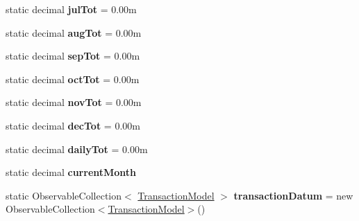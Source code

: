 \begin{DoxyCompactItemize}
static decimal {\bfseries jul\+Tot} = 0.\+00m
\item 
\mbox{\label{class_pocket_saver_1_1_view_models_1_1_home_page_1_1_home_page_view_model_ad6d58a2aa9455006970a5f7965838560}} 
static decimal {\bfseries aug\+Tot} = 0.\+00m
\item 
\mbox{\label{class_pocket_saver_1_1_view_models_1_1_home_page_1_1_home_page_view_model_a078932979150486d47e7b58315b7d73b}} 
static decimal {\bfseries sep\+Tot} = 0.\+00m
\item 
\mbox{\label{class_pocket_saver_1_1_view_models_1_1_home_page_1_1_home_page_view_model_ac6c25c485a627b506677a58374420aa3}} 
static decimal {\bfseries oct\+Tot} = 0.\+00m
\item 
\mbox{\label{class_pocket_saver_1_1_view_models_1_1_home_page_1_1_home_page_view_model_a0d65f819fd68b7aed5f345dbcf6cc1a4}} 
static decimal {\bfseries nov\+Tot} = 0.\+00m
\item 
\mbox{\label{class_pocket_saver_1_1_view_models_1_1_home_page_1_1_home_page_view_model_a9056e97b107389f478d9c65df09854d1}} 
static decimal {\bfseries dec\+Tot} = 0.\+00m
\item 
\mbox{\label{class_pocket_saver_1_1_view_models_1_1_home_page_1_1_home_page_view_model_af25cd2db69255a24c26b8612e423a7fb}} 
static decimal {\bfseries daily\+Tot} = 0.\+00m
\item 
\mbox{\label{class_pocket_saver_1_1_view_models_1_1_home_page_1_1_home_page_view_model_a4957ea515a85f86cf70211a870140e2d}} 
static decimal {\bfseries current\+Month}
\item 
\mbox{\label{class_pocket_saver_1_1_view_models_1_1_home_page_1_1_home_page_view_model_a3034fbc8b70023bf0d26cd6eef85f9c0}} 
static Observable\+Collection$<$ \hyperlink{class_pocket_saver_1_1_models_1_1_transaction_model}{Transaction\+Model} $>$ {\bfseries transaction\+Datum} = new Observable\+Collection$<$\hyperlink{class_pocket_saver_1_1_models_1_1_transaction_model}{Transaction\+Model}$>$()
\end{DoxyCompactItemize}


